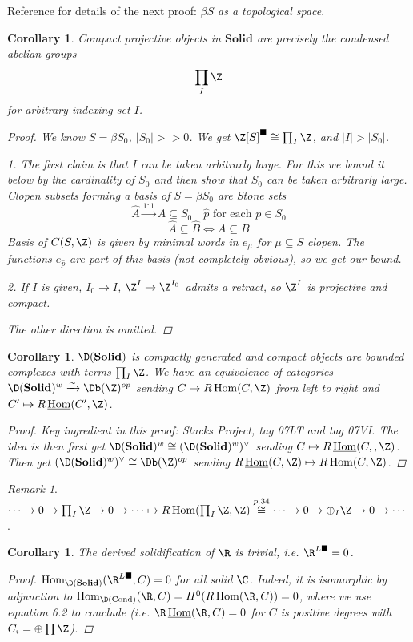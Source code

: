 \documentclass[A4paper, british]{amsart}
\theoremstyle{darkgreentheorem}
\newtheorem{cor}[thm]{Corollary}
\theoremstyle{darkbluedefinition}
\theoremstyle{darkredexample}
\theoremstyle{remark}
\newtheorem{rem}[thm]{Remark}
\DeclareMathOperator{\Hom}{Hom}
\DeclareMathOperator{\Cond}{Cond}
\DeclareMathOperator{\ihom}{\underline{Hom}}
\newcommand{\Solid}{\mathbf{Solid}}
\newcommand{\1}{\mathbbm{1}}
\newcommand{\op}{\oplus}
\newcommand{\dual}{^{\vee}}
\newcommand{\sub}{\subseteq}
\newcommand{\solid}{^{\blacksquare}}
\newcommand{\dsolid}{^{L\blacksquare}}
\begin{document}
Reference for details of the next proof: \textit{$\beta S$ as a topological space}.
\begin{cor}
    Compact projective objects in $\Solid$ are precisely the condensed abelian groups
    \[ \prod_{I} \Z \]
    for arbitrary indexing set $I$.
    \begin{proof}
	We know $S=\beta S_{0}$, $|S_{0}|>> 0$.
	We get $\Z[S]\solid \cong \prod_{I}\Z$, and $|I|>|S_{0}|$.
	
	1. The first claim is that $I$ can be taken arbitrarly large.
	For this we bound it below by the cardinality of $S_{0}$ and then show that $S_{0}$ can be taken arbitrarly large.
	Clopen subsets forming a basis of $S=\beta S_{0}$ are \textit{Stone sets}
	\[ \hat{A}\overset{1:1}{\longrightarrow} A\sub S_{0} \quad \hat{p} \text{ for each }p\in S_{0}\]
	\[ \hat{A}\sub \hat{B} \Leftrightarrow A\sub B\]
	Basis of $C(S,\Z)$ is given by minimal words in $e_{\mu}$ for $\mu\sub S$ clopen.
	The functions $e_{\hat{p}}$ are part of this basis (not completely obvious), so we get our bound.

	2. If $I$ is given, $I_{0}\to I$, $\Z^{I}\to \Z^{I_{0}}$ admits a retract, so $\Z^{I}$ is projective and compact.

	The other direction is omitted.
    \end{proof}
\end{cor}

\begin{cor}
    $\D(\Solid)$ is compactly generated and compact objects are bounded complexes with terms $\prod_{I}\Z$.
    We have an equivalence of categories $\D(\Solid)^{w}\xrightarrow{\sim} \Db(\Z)^{op}$ sending $C\mapsto R\Hom(C,\Z)$ from left to right and $C'\mapsto R\ihom(C',\Z)$.
    \begin{proof}
	Key ingredient in this proof: Stacks Project, tag 07LT and tag 07VI.
	The idea is then first get $\D(\Solid)^{w}\cong (\D(\Solid)^{w})\dual $ sending $C\mapsto R\ihom(C,,\Z)$.
	Then get $(\D(\Solid)^{w})\dual \cong \Db(\Z)^{op}$ sending $R\ihom(C,\Z)\mapsto R\Hom(C,\Z)$.
    \end{proof}
\end{cor}

\begin{rem}
    $\cdots \to 0 \to \prod_{I}\Z \to 0 \to \cdots \mapsto R\Hom(\prod_{I}\Z,\Z)\overset{p. 34}{\cong} \cdots \to 0\to \op_{I}\Z\to 0\to \cdots $.
\end{rem}

\begin{cor}
    The derived solidification of $\R$ is trivial, i.e. $\R\dsolid=0$.
    \begin{proof}
	$\Hom_{\D(\Solid)}(\R\dsolid,C)=0$ for all solid $\C$.
	Indeed, it is isomorphic by adjunction to $\Hom_{\D(\Cond)}(\R,C)=H^{0}(R\Hom(\R,C))=0$, where we use equation 6.2 to conclude (i.e. $\R\ihom(\R,C)=0$ for $C$ is positive degrees with $C_{i}=\op\prod\Z$).
    \end{proof}
\end{cor}
\end{document}
